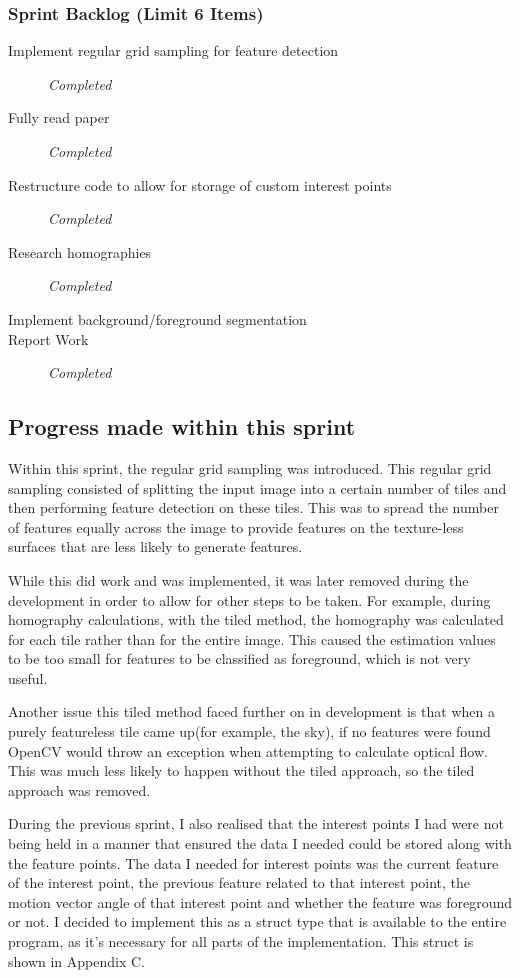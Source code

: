 \subsubsection{Sprint Backlog (Limit 6 Items)}
\begin{description}
  \item[Implement regular grid sampling for feature detection] \em{Completed}
  \item[Fully read paper] \em{Completed}
  \item[Restructure code to allow for storage of custom interest points] \em{Completed}
  \item[Research homographies] \em{Completed}
  \item[Implement background/foreground segmentation]
  \item[Report Work] \em{Completed}
\end{description}
\clearpage
\subsection{Progress made within this sprint}
Within this sprint, the regular grid sampling was introduced. This regular grid sampling consisted of splitting the input image into a certain number of tiles and then performing feature detection on these tiles. This was to spread the number of features equally across the image to provide features on the texture-less surfaces that are less likely to generate features.

 While this did work and was implemented, it was later removed during the development in order to allow for other steps to be taken. For example, during homography calculations, with the tiled method, the homography was calculated for each tile rather than for the entire image. This caused the estimation values to be too small for features to be classified as foreground, which is not very useful. 

Another issue this tiled method faced further on in development is that when a purely featureless tile came up(for example, the sky), if no features were found OpenCV would throw an exception when attempting to calculate optical flow. This was much less likely to happen without the tiled approach, so the tiled approach was removed.

During the previous sprint, I also realised that the interest points I had were not being held in a manner that ensured the data I needed could be stored along with the feature points. The data I needed for interest points was the current feature of the interest point, the previous feature related to that interest point, the motion vector angle of that interest point and whether the feature was foreground or not. I decided to implement this as a struct type that is available to the entire program, as it's necessary for all parts of the implementation. This struct is shown in Appendix C.
